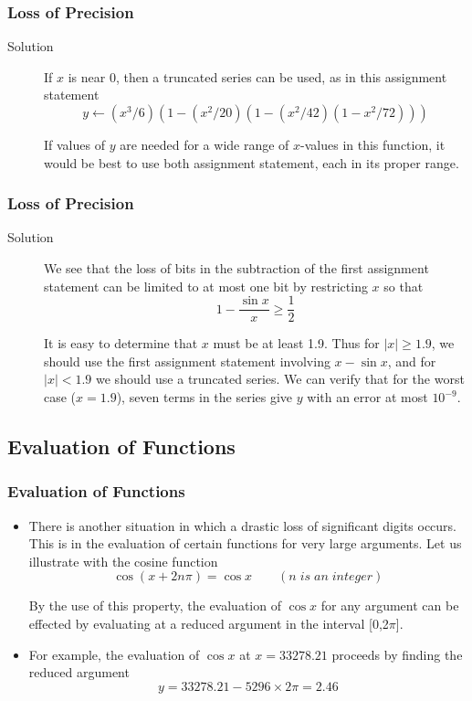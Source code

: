 \documentclass[notheorems,mathserif,table,compress]{beamer}  %
\begin{document}
\begin{frame}
\frametitle{Loss of Precision}
\begin{description}
\item[Solution] If $x$ is near 0, then a truncated series can be used, as in this assignment statement
\begin{displaymath}
y\leftarrow({x^3}/{6})(1-({x^2}/{20})(1-({x^2}/{42})(1-{x^2}/{72})))
\end{displaymath}

If values of $y$ are needed for a wide range of $x$-values in this function, it would be best to use both assignment statement, each in its proper range.
\end{description} 
\end{frame}

\begin{frame}
\frametitle{Loss of Precision}
\begin{description}
\item[Solution] We see that the loss of bits in the subtraction of the first assignment statement can be limited to at most one bit by restricting $x$ so that
\begin{displaymath}
1-\frac{\sin x}{x}\geq \frac{1}{2}
\end{displaymath}

It is easy to determine that $x$ must be at least 1.9. Thus for $|x|\geq 1.9$, we should use the first assignment statement involving $x-\sin x$, and for $|x|<1.9$ we should use a truncated series. We can verify that for the worst case ($x=1.9$), seven terms in the series give $y$ with an error at most $10^{-9}$.
\end{description} 
\end{frame}

\subsection{Evaluation of Functions}

\begin{frame}
\frametitle{Evaluation of Functions}
\begin{itemize}
\item There is another situation in which a drastic loss of significant digits occurs. This is in the evaluation of certain functions for very large arguments. Let us illustrate with the cosine function
\begin{displaymath}
\cos (x+2n\pi)=\cos x \qquad (n\;is\;an\;integer)
\end{displaymath}

By the use of this property, the evaluation of $\cos x$ for any argument can be effected by evaluating at a reduced argument in the interval [0,2$\pi$]. 
\item For example, the evaluation of $\cos x$ at $x=33278.21$ proceeds by finding the reduced argument
\begin{displaymath}
y=33278.21-5296\times2\pi=2.46
\end{displaymath}

\end{itemize}
\end{frame}
\end{document}
